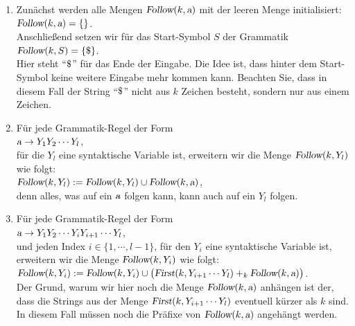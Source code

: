 \begin{enumerate}
\item Zun\"achst werden alle Mengen $\textsl{Follow}(k, \textsl{a})$ mit der leeren Menge initialisiert:
      \\[0.2cm]
      \hspace*{1.3cm}
      $\textsl{Follow}(k, \textsl{a}) = \{\}$.
      \\[0.2cm]
      Anschlie{\ss}end setzen wir f\"ur das Start-Symbol $S$ der Grammatik
      \\[0.2cm]
      \hspace*{1.3cm}
      $\textsl{Follow}(k, S) = \{ \symbol{36} \}$.
      \\[0.2cm]
      Hier steht ``$\symbol{36}$'' f\"ur das Ende der Eingabe.  Die Idee ist, dass hinter dem
      Start-Symbol keine weitere Eingabe mehr kommen kann.  Beachten Sie, dass in diesem
      Fall der String ``$\symbol{36}$'' nicht aus $k$ Zeichen besteht, sondern nur aus
      einem Zeichen.
\item F\"ur jede Grammatik-Regel der Form
      \\[0.2cm]
      \hspace*{1.3cm}
      $\textsl{a} \rightarrow Y_1 Y_2 \cdots Y_l$,
      \\[0.2cm]
      f\"ur die $Y_l$ eine syntaktische Variable ist, erweitern wir die Menge
      $\textsl{Follow}(k, Y_l)$ wie folgt:
      \\[0.2cm]
      \hspace*{1.3cm}
      $\textsl{Follow}(k, Y_l) := \textsl{Follow}(k, Y_l) \cup \textsl{Follow}(k, \textsl{a})$,
      \\[0.2cm]
      denn alles, was auf ein $\textsl{a}$ folgen kann, kann auch auf ein $Y_l$ folgen.
\item F\"ur jede Grammatik-Regel der Form
      \\[0.2cm]
      \hspace*{1.3cm}
      $\textsl{a} \rightarrow Y_1 Y_2 \cdots Y_i Y_{i+1} \cdots Y_l$,
      \\[0.2cm]
      und jeden Index $i \in \{1, \cdots, l-1\}$, f\"ur den $Y_i$ eine syntaktische Variable
      ist, erweitern wir die Menge $\textsl{Follow}(k, Y_i)$ wie folgt:
      \\[0.2cm]
      \hspace*{1.3cm}
      $\textsl{Follow}(k, Y_i) := \textsl{Follow}(k, Y_i) \cup
       \bigl(\textsl{First}(k, Y_{i+1} \cdots Y_l) +_k \textsl{Follow}(k,\textsl{a})\bigr) 
      $.
      \\[0.2cm]
      Der Grund, warum wir hier noch die Menge $\textsl{Follow}(k,\textsl{a})$ anh\"angen ist der,
      dass die Strings aus  der Menge $\textsl{First}(k, Y_{i+1} \cdots Y_l)$ eventuell
      k\"urzer als $k$ sind.  In diesem Fall m\"ussen noch die Pr\"afixe von
      $\textsl{Follow}(k, \textsl{a})$ angeh\"angt werden.


\end{enumerate}
